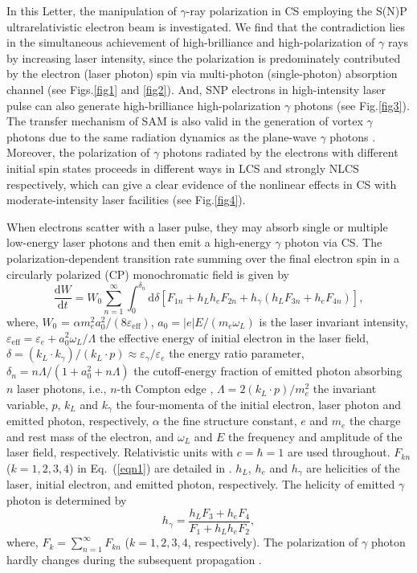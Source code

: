 \documentclass[10pt,twocolumn,showpacs,amsmath,amssymb,floatfix,superscriptaddress]{revtex4-2}
\begin{document}
In this Letter, the manipulation of $\gamma$-ray polarization in CS employing the S(N)P ultrarelativistic electron beam  is investigated. We find that the contradiction lies in the simultaneous achievement of high-brilliance and high-polarization of $\gamma$ rays by increasing laser intensity, since the polarization is predominately contributed by the electron (laser photon) spin via multi-photon (single-photon) absorption channel (see Figs.\ref{fig1} and \ref{fig2}).  And, SNP electrons in high-intensity laser pulse can also generate high-brilliance high-polarization $\gamma$ photons (see Fig.\ref{fig3}). The transfer mechanism of SAM is also valid in the generation of vortex $\gamma$ photons due to the same radiation dynamics as the plane-wave $\gamma$ photons \cite{Ababekri2022}.  Moreover, the polarization of $\gamma$ photons radiated by the electrons with different initial spin states proceeds in different ways in LCS and strongly NLCS respectively, which can give a clear evidence of the nonlinear effects in CS with moderate-intensity laser facilities (see Fig.\ref{fig4}).

When electrons scatter with a laser pulse, they may absorb single or multiple low-energy laser photons and then emit a high-energy $\gamma$ photon via CS. The polarization-dependent transition rate summing over the final electron spin in a circularly polarized (CP) monochromatic field is given by \cite{CAIN242,Ivanov2004}
\begin{equation}
\frac{\mathrm{d}W}{\mathrm{d}t} = W_0\sum_{n=1}^{\infty} \int_{0}^{\delta_n} \mathrm{d} \delta[F_{1n}+h_L h_e F_{2n}+h_\gamma (h_L F_{3n}+h_e F_{4n})], \label{eqn1}
\end{equation}  
where, $W_0$ = $\alpha m_e^2 a_0^2/(8\varepsilon_\mathrm{eff})$, $a_0 = \left| e \right| E / (m_e \omega_L)$ is the laser invariant intensity, $\varepsilon_\mathrm{eff} = \varepsilon_e+a_0^2 \omega_L/\Lambda$ the effective energy of initial electron in the laser field, $\delta=(k_L \cdot k_\gamma)/(k_L \cdot p) \approx \varepsilon_\gamma/\varepsilon_e$ the energy ratio parameter, $\delta_n = n \Lambda / (1+a_0^2+n \Lambda)$ the cutoff-energy fraction of emitted photon absorbing $n$ laser photons, i.e., $n$-th Compton edge \cite{Ivanov2004}, $\Lambda=2(k_L \cdot p)/m_e^2$ the invariant variable, $p$, $k_L$ and $k_\gamma$ the four-momenta of the initial electron, laser photon and emitted photon, respectively, $\alpha$ the fine structure constant, $e$ and $m_e$ the charge and rest mass of the electron, and $\omega_L$ and $E$ the frequency and amplitude of the laser field, respectively. Relativistic units with $c=\hbar=1$ are used throughout. $F_{kn}$ ($k = 1,2,3,4$) in Eq.~(\ref{eqn1}) are detailed in \cite{Supplemental}. $h_L$, $h_e$ and $h_\gamma$ are helicities of the laser, initial electron, and emitted photon, respectively. The helicity of emitted $\gamma$ photon is determined by \cite{CAIN242,Ivanov2004}
\begin{equation}
h_\gamma = \frac{h_LF_3+h_eF_4}{F_1+h_Lh_eF_2}, \label{eqn2} 
\end{equation}
where, $F_k = \sum_{n=1}^{\infty} F_{kn}$ ($k=1,2,3,4$, respectively). The polarization of $\gamma$ photon hardly changes during the subsequent propagation \cite{CAIN242,Ivanov2005,Supplemental}.
\end{document}
